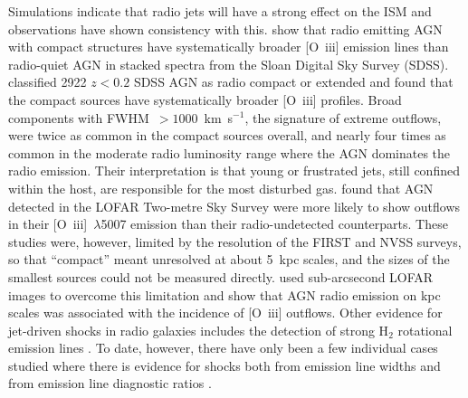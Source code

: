 \documentclass[linenumbers,trackchanges]{aastex701}
\begin{document}
Simulations \citep[e.g.][]{mukherjee25} indicate that radio jets will have a strong effect on the ISM and observations have shown consistency with this. \citet{mullaney2013} show that radio emitting AGN with compact structures have systematically broader [O~{\sc iii}] emission lines than radio-quiet AGN in stacked spectra from the Sloan Digital Sky Survey (SDSS). \citet{molyneux2019} classified 2922 $z<0.2$ SDSS AGN as radio compact or extended and found that the compact sources have systematically broader [O~{\sc iii}] profiles. 
Broad components with FWHM~$>1000$~km~s$^{-1}$, the signature of extreme outflows, were twice as common in the compact sources overall, and nearly four times as common in the moderate radio luminosity range where the AGN dominates the radio emission.  
Their interpretation is that young or frustrated jets, still confined within the host, are responsible for the most disturbed gas. \citet{escott25} found that AGN detected in the LOFAR Two-metre Sky Survey were more likely to show outflows in their [O~{\sc iii}]~$\lambda$5007 emission than their radio-undetected counterparts.
These studies were, however, limited by the resolution of the FIRST and NVSS surveys, so that ``compact'' meant unresolved at about 5~kpc scales, and the sizes of the smallest sources could not be
measured directly. \citet{escott26} used sub-arcsecond LOFAR images to overcome this limitation and show that AGN radio emission on kpc scales was associated with the incidence of [O~{\sc iii}] outflows. Other evidence for jet-driven shocks in radio galaxies includes the detection of strong H$_{2}$ rotational emission lines \citep{ogle10}. To date, however, there have only been a few individual cases studied where there is evidence for shocks both from emission line widths and from emission line diagnostic ratios
\citep[e.g. 3C326N,][]{leftley24}.
\end{document}
